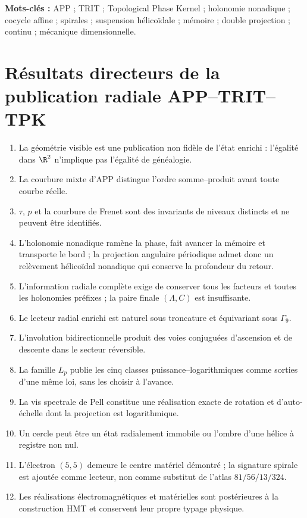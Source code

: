 \bigskip
\noindent\textbf{Mots-clés :} APP ; TRIT ; Topological Phase Kernel ; holonomie nonadique ; cocycle affine ; spirales ; suspension hélicoïdale ; mémoire ; double projection ; continu ; mécanique dimensionnelle.

\part{Résultats directeurs de la publication radiale APP--TRIT--TPK}
\begin{enumerate}[label=\textbf{R\arabic*.},leftmargin=12mm]
\item La géométrie visible est une publication non fidèle de l'état enrichi : l'égalité dans \(\R^2\) n'implique pas l'égalité de généalogie.
\item La courbure mixte d'APP distingue l'ordre somme--produit avant toute courbe réelle.
\item \(\tau\), \(p\) et la courbure de Frenet sont des invariants de niveaux distincts et ne peuvent être identifiés.
\item L'holonomie nonadique ramène la phase, fait avancer la mémoire et transporte le bord ; la projection angulaire périodique admet donc un relèvement hélicoïdal nonadique qui conserve la profondeur du retour.
\item L'information radiale complète exige de conserver tous les facteurs et toutes les holonomies préfixes ; la paire finale \((\Lambda,C)\) est insuffisante.
\item Le lecteur radial enrichi est naturel sous troncature et équivariant sous \(\Gamma_9\).
\item L'involution bidirectionnelle produit des voies conjuguées d'ascension et de descente dans le secteur réversible.
\item La famille \(L_p\) publie les cinq classes puissance--logarithmiques comme sorties d'une même loi, sans les choisir à l'avance.
\item La vis spectrale de Pell constitue une réalisation exacte de rotation et d'auto-échelle dont la projection est logarithmique.
\item Un cercle peut être un état radialement immobile ou l'ombre d'une hélice à registre non nul.
\item L'électron \((5,5)\) demeure le centre matériel démontré ; la signature spirale est ajoutée comme lecteur, non comme substitut de l'atlas \(81/56/13/324\).
\item Les réalisations électromagnétiques et matérielles sont postérieures à la construction HMT et conservent leur propre typage physique.
\end{enumerate}

